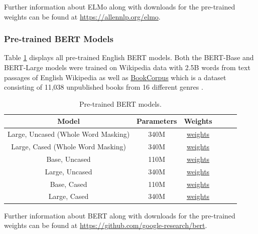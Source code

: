 \noindent
Further information about ELMo along with downloads for the pre-trained weights can be found at \url{https://allennlp.org/elmo}.

\subsubsection{Pre-trained BERT Models}

Table \ref{table:5} displays all pre-trained English BERT models.
Both the BERT-Base and BERT-Large models were trained on Wikipedia data with 2.5B words from text passages of English Wikipedia as well as \href{https://yknzhu.wixsite.com/mbweb}{BookCorpus} which is a dataset consisting of 11,038 unpublished books from 16 different genres \citep{DBLP:journals/corr/abs-1810-04805} \citep{moviebook}.  

\newpage
\begin{table}[h!]
  \begin{center}
    \begin{tabular}{ |c|c|c|c|c|c| }
    \hline
      \textbf{Model} & \textbf{Parameters} & \textbf{Weights} \\ 
      \hline
      Large, Uncased (Whole Word Masking) & 340M & \href{https://storage.googleapis.com/bert_models/2019_05_30/wwm_uncased_L-24_H-1024_A-16.zip}{weights} \\     
      Large, Cased (Whole Word Masking) & 340M & \href{https://storage.googleapis.com/bert_models/2019_05_30/wwm_cased_L-24_H-1024_A-16.zip}{weights} \\  
      Base, Uncased & 110M & \href{https://storage.googleapis.com/bert_models/2018_10_18/uncased_L-12_H-768_A-12.zip}{weights} \\  
      Large, Uncased & 340M & \href{https://storage.googleapis.com/bert_models/2018_10_18/uncased_L-24_H-1024_A-16.zip}{weights} \\   
      Base, Cased  & 110M & \href{https://storage.googleapis.com/bert_models/2018_10_18/cased_L-12_H-768_A-12.zip}{weights} \\
      Large, Cased & 340M & \href{https://storage.googleapis.com/bert_models/2018_10_18/cased_L-24_H-1024_A-16.zip}{weights} \\
    \hline 
    \end{tabular}
    \caption{Pre-trained BERT models.}
    \label{table:5}
    \citep{DBLP:journals/corr/abs-1810-04805}
  \end{center}
\end{table}

\noindent
Further information about BERT along with downloads for the pre-trained weights can be found at \url{https://github.com/google-research/bert}.

